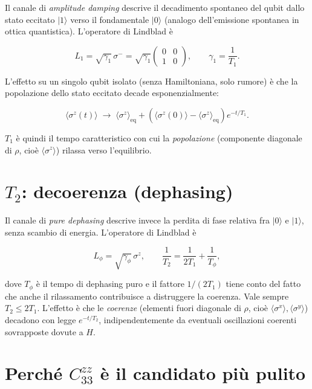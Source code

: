 \documentclass[11pt,a4paper]{article}
\newcommand{\ket}[1]{\lvert #1 \rangle}
\begin{document}
Il canale di \emph{amplitude damping} descrive il decadimento spontaneo del qubit dallo stato eccitato $\ket{1}$ verso il fondamentale $\ket{0}$ (analogo dell'emissione spontanea in ottica quantistica). L'operatore di Lindblad è

\begin{equation}
L_1 = \sqrt{\gamma_1}\,\sigma^- = \sqrt{\gamma_1}\begin{pmatrix}0&0\\1&0\end{pmatrix}, \qquad \gamma_1 = \frac{1}{T_1}.
\end{equation}

L'effetto su un singolo qubit isolato (senza Hamiltoniana, solo rumore) è che la popolazione dello stato eccitato decade esponenzialmente:

\begin{equation}
\langle\sigma^z(t)\rangle \;\longrightarrow\; \langle\sigma^z\rangle_{\text{eq}} + \left(\langle\sigma^z(0)\rangle-\langle\sigma^z\rangle_{\text{eq}}\right)e^{-t/T_1}.
\end{equation}

$T_1$ è quindi il tempo caratteristico con cui la \emph{popolazione} (componente diagonale di $\rho$, cioè $\langle\sigma^z\rangle$) rilassa verso l'equilibrio.

\section{$T_2$: decoerenza (dephasing)}

Il canale di \emph{pure dephasing} descrive invece la perdita di fase relativa fra $\ket{0}$ e $\ket{1}$, senza scambio di energia. L'operatore di Lindblad è

\begin{equation}
L_\phi = \sqrt{\gamma_\phi}\,\sigma^z, \qquad \frac{1}{T_2} = \frac{1}{2T_1}+\frac{1}{T_\phi},
\end{equation}

dove $T_\phi$ è il tempo di dephasing puro e il fattore $1/(2T_1)$ tiene conto del fatto che anche il rilassamento contribuisce a distruggere la coerenza. Vale sempre $T_2\le 2T_1$. L'effetto è che le \emph{coerenze} (elementi fuori diagonale di $\rho$, cioè $\langle\sigma^x\rangle,\langle\sigma^y\rangle$) decadono con legge $e^{-t/T_2}$, indipendentemente da eventuali oscillazioni coerenti sovrapposte dovute a $H$.

\section{Perché $C_{33}^{zz}$ è il candidato più pulito}
\label{sec:motivazione}
\end{document}
